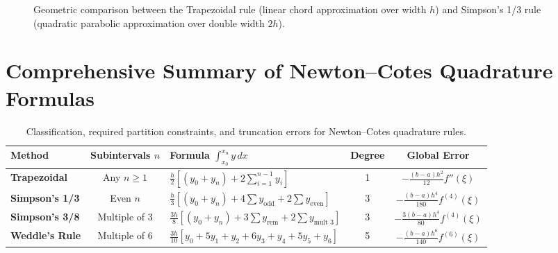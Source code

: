 \begin{figure}[htbp]
\caption{Geometric comparison between the Trapezoidal rule (linear chord approximation over width $h$) and Simpson's 1/3 rule (quadratic parabolic approximation over double width $2h$).}
\label{fig:quadrature_comparison}
\end{figure}

\section{Comprehensive Summary of Newton--Cotes Quadrature Formulas}
\label{sec:summary_quadrature_table}

\begin{table}[htbp]
\centering
\small
\renewcommand{\arraystretch}{1.4}
\begin{tabular}{|l|c|l|c|c|}
\hline
\textbf{Method} & \textbf{Subintervals $n$} & \textbf{Formula $\int_{x_0}^{x_n} y \, dx$} & \textbf{Degree} & \textbf{Global Error} \\ \hline\hline
\textbf{Trapezoidal} & Any $n \ge 1$ & $\frac{h}{2}[(y_0 + y_n) + 2\sum_{i=1}^{n-1} y_i]$ & 1 & $-\frac{(b-a)h^2}{12} f''(\xi)$ \\ \hline
\textbf{Simpson's 1/3} & Even $n$ & $\frac{h}{3}[(y_0 + y_n) + 4\sum y_{\text{odd}} + 2\sum y_{\text{even}}]$ & 3 & $-\frac{(b-a)h^4}{180} f^{(4)}(\xi)$ \\ \hline
\textbf{Simpson's 3/8} & Multiple of 3 & $\frac{3h}{8}[(y_0 + y_n) + 3\sum y_{\text{rem}} + 2\sum y_{\text{mult 3}}]$ & 3 & $-\frac{3(b-a)h^4}{80} f^{(4)}(\xi)$ \\ \hline
\textbf{Weddle's Rule} & Multiple of 6 & $\frac{3h}{10}[y_0 + 5y_1 + y_2 + 6y_3 + y_4 + 5y_5 + y_6]$ & 5 & $-\frac{(b-a)h^6}{140} f^{(6)}(\xi)$ \\ \hline
\end{tabular}
\caption{Classification, required partition constraints, and truncation errors for Newton--Cotes quadrature rules.}
\end{table}

